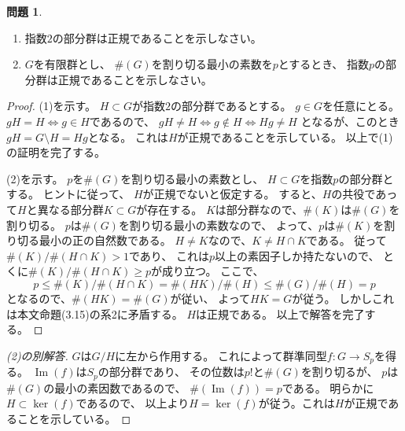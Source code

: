 \documentclass[uplatex]{jsreport}
\theoremstyle{definition}
\newtheorem{prob}[prob]{問題}
\DeclareMathOperator{\im}{\mathrm{Im}}
\begin{document}
\begin{prob}
  \
  \begin{enumerate}
    \item
    指数\(2\)の部分群は正規であることを示しなさい。
    \item
    \(G\)を有限群とし、
    \(\#(G)\)を割り切る最小の素数を\(p\)とするとき、
    指数\(p\)の部分群は正規であることを示しなさい。
  \end{enumerate}
\end{prob}


\begin{proof}
  (1)を示す。
  \(H\subset G\)が指数\(2\)の部分群であるとする。
  \(g\in G\)を任意にとる。
  \(gH = H \iff g\in H\)であるので、
  \(gH\neq H \iff g\not\in H \iff Hg\neq H\)
  となるが、このとき
  \(gH = G\setminus H = Hg\)となる。
  これは\(H\)が正規であることを示している。
  以上で(1)の証明を完了する。

  (2)を示す。
  \(p\)を\(\#(G)\)を割り切る最小の素数とし、
  \(H\subset G\)を指数\(p\)の部分群とする。
  ヒントに従って、
  \(H\)が正規でないと仮定する。
  すると、\(H\)の共役であって\(H\)と異なる部分群\(K\subset G\)が存在する。
  \(K\)は部分群なので、\(\#(K)\)は\(\#(G)\)を割り切る。
  \(p\)は\(\#(G)\)を割り切る最小の素数なので、
  よって、\(p\)は\(\#(K)\)を割り切る最小の正の自然数である。
  \(H\neq K\)なので、\(K\neq H\cap K\)である。
  従って\(\#(K)/\#(H\cap K) > 1\)であり、
  これは\(p\)以上の素因子しか持たないので、
  とくに\(\#(K)/\#(H\cap K)\geq p\)が成り立つ。
  ここで、
  \[p \leq \#(K)/\#(H\cap K) = \#(HK)/\#(H) \leq \#(G)/\#(H) = p\]
  となるので、\(\#(HK) = \#(G)\)が従い、
  よって\(HK = G\)が従う。
  しかしこれは本文命題(3.15)の系2に矛盾する。
  \(H\)は正規である。
  以上で解答を完了する。
\end{proof}


\begin{proof}[(2)の別解答]
  \(G\)は\(G/H\)に左から作用する。
  これによって群準同型\(f:G\to S_p\)を得る。
  \(\im(f)\)は\(S_p\)の部分群であり、
  その位数は\(p!\)と\(\#(G)\)を割り切るが、
  \(p\)は\(\#(G)\)の最小の素因数であるので、
  \(\#(\im(f)) = p\)である。
  明らかに\(H\subset \ker(f)\)であるので、
  以上より\(H=\ker(f)\)が従う。これは\(H\)が正規であることを示している。
\end{proof}
\end{document}
